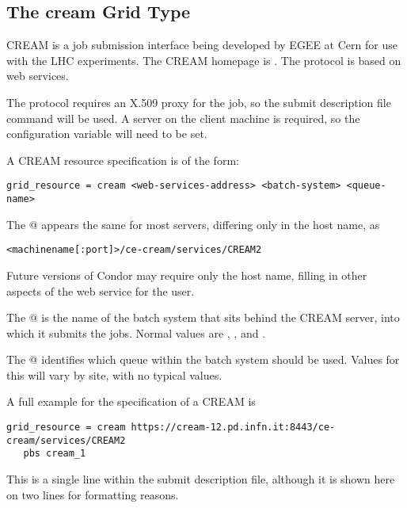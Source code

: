 
\subsection{\label{sec:CREAM}The cream Grid Type }

CREAM is a job submission interface being developed by EGEE at Cern 
for use with the LHC experiments.
The CREAM homepage is .
The protocol is based on web services.

The protocol requires an X.509 proxy for the job,
so the submit description file command 
will be used.
A  server on the client machine is required,
so the configuration variable 
will need to be set. 

A CREAM resource specification is of the form:
\footnotesize
\begin{verbatim}
grid_resource = cream <web-services-address> <batch-system> <queue-name>
\end{verbatim}
\normalsize
The @ appears the same for most servers,
differing only in the host name, as
\begin{verbatim}
<machinename[:port]>/ce-cream/services/CREAM2
\end{verbatim}
Future versions of Condor may require only the host name, 
filling in other aspects of the web service for the user.

The @ is the name of the batch system that sits behind
the CREAM server,
into which it submits the jobs.
Normal values are \verb@pbs@, \verb@lsf@, and \verb@condor@.

The @ identifies which queue within the batch system
should be used.
Values for this will vary by site, with no typical values.

A full example for the specification of a CREAM  is
\footnotesize
\begin{verbatim}
grid_resource = cream https://cream-12.pd.infn.it:8443/ce-cream/services/CREAM2
   pbs cream_1
\end{verbatim}
\normalsize
This is a single line within the submit description file,
although it is shown here on two lines for formatting reasons.

